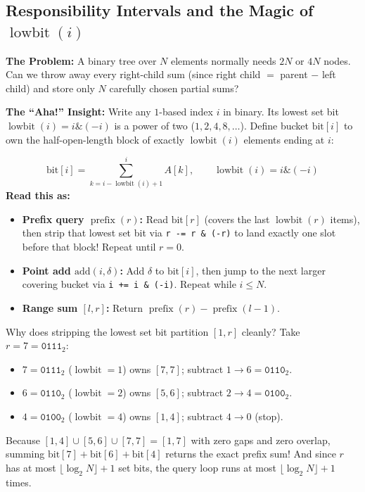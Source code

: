 \documentclass[11pt,a4paper]{article}
\theoremstyle{definition}
\newcommand{\painbeat}{\textbf{\color{accentamber}The Problem:} }
\newcommand{\ahabeat}{\textbf{\color{accentteal}The ``Aha!'' Insight:} }
\begin{document}
\subsection{Responsibility Intervals and the Magic of \texorpdfstring{$\operatorname{lowbit}(i)$}{lowbit(i)}}

\painbeat A binary tree over $N$ elements normally needs $2N$ or $4N$ nodes. Can we throw away every right-child sum (since right child $=$ parent $-$ left child) and store only $N$ carefully chosen partial sums?

\ahabeat Write any $1$-based index $i$ in binary. Its lowest set bit $\operatorname{lowbit}(i) = i \mathbin{\&} (-i)$ is a power of two ($1, 2, 4, 8, \dots$). Define bucket $\text{bit}[i]$ to own the half-open-length block of exactly $\operatorname{lowbit}(i)$ elements ending at $i$:
\begin{formulabox}
$$\text{bit}[i] = \sum_{k = i - \operatorname{lowbit}(i) + 1}^{i} A[k], \qquad \operatorname{lowbit}(i) = i \mathbin{\&} (-i)$$
\textbf{Read this as:}
\begin{itemize}[itemsep=2pt, topsep=2pt]
    \item \textbf{Prefix query $\operatorname{prefix}(r)$:} Read $\text{bit}[r]$ (covers the last $\operatorname{lowbit}(r)$ items), then strip that lowest set bit via \texttt{r -= r \& (-r)} to land exactly one slot before that block! Repeat until $r = 0$.
    \item \textbf{Point add $\text{add}(i, \delta)$:} Add $\delta$ to $\text{bit}[i]$, then jump to the next larger covering bucket via \texttt{i += i \& (-i)}. Repeat while $i \le N$.
    \item \textbf{Range sum $[l, r]$:} Return $\operatorname{prefix}(r) - \operatorname{prefix}(l - 1)$.
\end{itemize}
\end{formulabox}

Why does stripping the lowest set bit partition $[1, r]$ cleanly? Take $r = 7 = \texttt{0111}_2$:
\begin{itemize}
    \item $7 = \texttt{0111}_2$ ($\operatorname{lowbit}=1$) owns $[7, 7]$; subtract $1 \to 6 = \texttt{0110}_2$.
    \item $6 = \texttt{0110}_2$ ($\operatorname{lowbit}=2$) owns $[5, 6]$; subtract $2 \to 4 = \texttt{0100}_2$.
    \item $4 = \texttt{0100}_2$ ($\operatorname{lowbit}=4$) owns $[1, 4]$; subtract $4 \to 0$ (stop).
\end{itemize}
Because $[1, 4] \cup [5, 6] \cup [7, 7] = [1, 7]$ with zero gaps and zero overlap, summing $\text{bit}[7] + \text{bit}[6] + \text{bit}[4]$ returns the exact prefix sum! And since $r$ has at most $\lfloor \log_2 N \rfloor + 1$ set bits, the query loop runs at most $\lfloor \log_2 N \rfloor + 1$ times.
\end{document}
